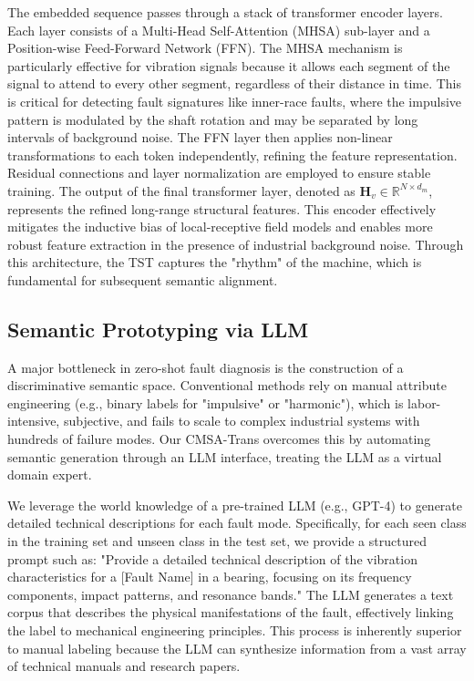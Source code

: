 \documentclass[journal]{IEEEtran}
\begin{document}
The embedded sequence passes through a stack of transformer encoder layers. Each layer consists of a Multi-Head Self-Attention (MHSA) sub-layer and a Position-wise Feed-Forward Network (FFN). The MHSA mechanism is particularly effective for vibration signals because it allows each segment of the signal to attend to every other segment, regardless of their distance in time. This is critical for detecting fault signatures like inner-race faults, where the impulsive pattern is modulated by the shaft rotation and may be separated by long intervals of background noise. The FFN layer then applies non-linear transformations to each token independently, refining the feature representation. Residual connections and layer normalization are employed to ensure stable training. The output of the final transformer layer, denoted as $\mathbf{H}_v \in \mathbb{R}^{N \times d_m}$, represents the refined long-range structural features. This encoder effectively mitigates the inductive bias of local-receptive field models and enables more robust feature extraction in the presence of industrial background noise. Through this architecture, the TST captures the "rhythm" of the machine, which is fundamental for subsequent semantic alignment.

\subsection{Semantic Prototyping via LLM}
A major bottleneck in zero-shot fault diagnosis is the construction of a discriminative semantic space. Conventional methods rely on manual attribute engineering (e.g., binary labels for "impulsive" or "harmonic"), which is labor-intensive, subjective, and fails to scale to complex industrial systems with hundreds of failure modes. Our CMSA-Trans overcomes this by automating semantic generation through an LLM interface, treating the LLM as a virtual domain expert.

We leverage the world knowledge of a pre-trained LLM (e.g., GPT-4) to generate detailed technical descriptions for each fault mode. Specifically, for each seen class in the training set and unseen class in the test set, we provide a structured prompt such as: "Provide a detailed technical description of the vibration characteristics for a [Fault Name] in a bearing, focusing on its frequency components, impact patterns, and resonance bands." The LLM generates a text corpus that describes the physical manifestations of the fault, effectively linking the label to mechanical engineering principles. This process is inherently superior to manual labeling because the LLM can synthesize information from a vast array of technical manuals and research papers.
\end{document}
